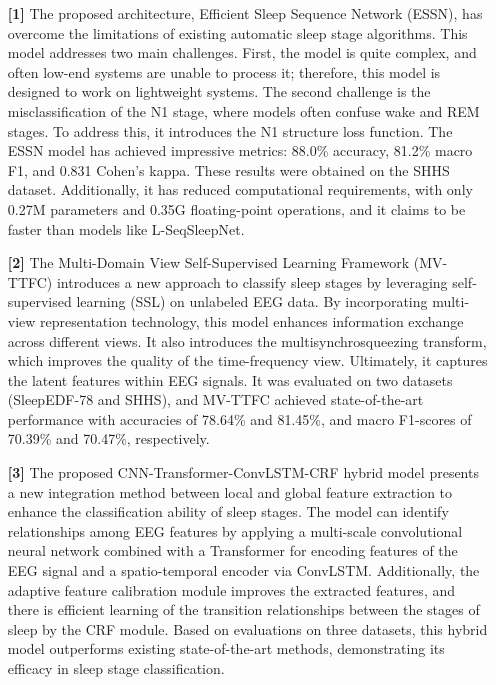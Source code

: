 \begin{enumerate}
    \item[\textbf{[1]}] The proposed architecture, Efficient Sleep Sequence Network (ESSN), has overcome the limitations of existing automatic sleep stage algorithms. This model addresses two main challenges. First, the model is quite complex, and often low-end systems are unable to process it; therefore, this model is designed to work on lightweight systems. The second challenge is the misclassification of the N1 stage, where models often confuse wake and REM stages. To address this, it introduces the N1 structure loss function. The ESSN model has achieved impressive metrics: 88.0\% accuracy, 81.2\% macro F1, and 0.831 Cohen’s kappa. These results were obtained on the SHHS dataset. Additionally, it has reduced computational requirements, with only 0.27M parameters and 0.35G floating-point operations, and it claims to be faster than models like L-SeqSleepNet.
    
    \item[\textbf{[2]}] The Multi-Domain View Self-Supervised Learning Framework (MV-TTFC) introduces a new approach to classify sleep stages by leveraging self-supervised learning (SSL) on unlabeled EEG data. By incorporating multi-view representation technology, this model enhances information exchange across different views. It also introduces the multisynchrosqueezing transform, which improves the quality of the time-frequency view. Ultimately, it captures the latent features within EEG signals. It was evaluated on two datasets (SleepEDF-78 and SHHS), and MV-TTFC achieved state-of-the-art performance with accuracies of 78.64\% and 81.45\%, and macro F1-scores of 70.39\% and 70.47\%, respectively.
    
    \item[\textbf{[3]}] The proposed CNN-Transformer-ConvLSTM-CRF hybrid model presents a new integration method between local and global feature extraction to enhance the classification ability of sleep stages. The model can identify relationships among EEG features by applying a multi-scale convolutional neural network combined with a Transformer for encoding features of the EEG signal and a spatio-temporal encoder via ConvLSTM. Additionally, the adaptive feature calibration module improves the extracted features, and there is efficient learning of the transition relationships between the stages of sleep by the CRF module. Based on evaluations on three datasets, this hybrid model outperforms existing state-of-the-art methods, demonstrating its efficacy in sleep stage classification.
\end{enumerate}
